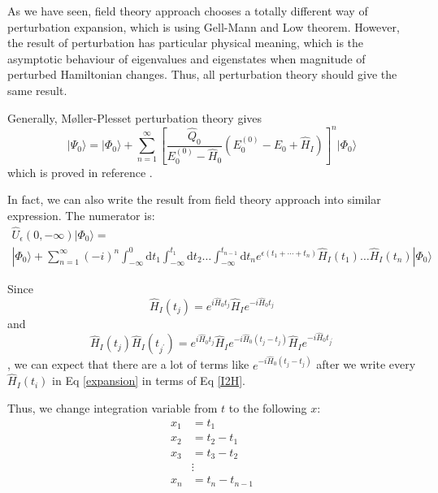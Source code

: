 As we have seen, field theory approach chooses a totally different way of perturbation expansion, which is using Gell-Mann and Low theorem.
However, the result of perturbation has particular physical meaning, which is the asymptotic behaviour of eigenvalues and eigenstates when magnitude of perturbed Hamiltonian changes.
Thus, all perturbation theory should give the same result.

Generally, M{\o}ller-Plesset perturbation theory gives
\begin{equation} \label{rspt}
| \Psi_{0} \rangle=| \Phi_{0} \rangle+\sum_{n=1}^{\infty}\left[\frac{\hat{Q}_{0}}{E_{0}^{(0)}-\hat{H}_{0}}\left(E_{0}^{(0)}-E_{0}+\hat{H}_{I}\right)\right]^{n} | \Phi_{0} \rangle
\end{equation}
which is proved in reference \cite{rsptproof}.

In fact, we can also write the result from field theory approach into similar expression.
The numerator is:
\begin{equation} \label{expansion}
\begin{array}{l}{\hat{U}_{\epsilon}(0,-\infty) | \Phi_{0} \rangle=} \\ { | \Phi_{0} \rangle+\sum_{n=1}^{\infty}(-i)^{n} \int_{-\infty}^{0} \mathrm{d} t_{1} \int_{-\infty}^{t_{1}} \mathrm{d} t_{2} \ldots \int_{-\infty}^{t_{n-1}} \mathrm{d} t_{n} e^{\epsilon\left(t_{1}+\cdots+t_{n}\right)} \hat{H}_{I}\left(t_{1}\right) \ldots \hat{H}_{I}\left(t_{n}\right) | \Phi_{0} \rangle}\end{array}
\end{equation}

Since
\begin{equation} \label{I2H}
\hat{H}_{I}\left(t_{j}\right)=e^{i \hat{H}_{0} t_{j}} \hat{H}_{I} e^{-i \hat{H}_{0} t_{j}}
\end{equation}
and 
\begin{equation}
\hat{H}_{I}\left(t_{j}\right) \hat{H}_{I}\left(t_{j^{\prime}}\right)=e^{i \hat{H}_{0} t_{j}} \hat{H}_{I} e^{-i \hat{H}_{0}\left(t_{j}-t_{j}\right)} \hat{H}_{I} e^{-i \hat{H}_{0} t_{j^{\prime}}}
\end{equation}
, we can expect that there are a lot of terms like $e^{-i \hat{H}_{0}\left(t_{j}-t_{j}\right)}$ after we write every $\hat{H}_I(t_i)$ in Eq \ref{expansion} in terms of Eq \ref{I2H}.

Thus, we change integration variable from $t$ to the following $x$:
\begin{equation}
	\begin{aligned} x_{1} &=t_{1} \\ x_{2} &=t_{2}-t_{1} \\ x_{3} &=t_{3}-t_{2} \\ & \vdots \\ x_{n} &=t_{n}-t_{n-1} \end{aligned}
\end{equation}

